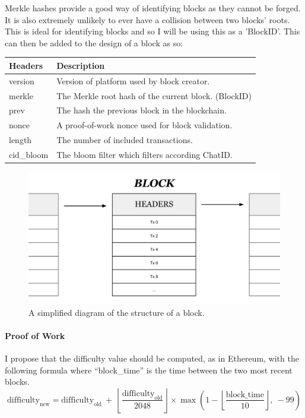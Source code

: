 \documentclass{article}
\begin{document}
Merkle hashes provide a good way of identifying blocks as they cannot be forged. It is also extremely unlikely to ever have a collision between two blocks' roots. This is ideal for identifying blocks and so I will be using this as a 'BlockID'. This can then be added to the design of a block as so:
\begin{table}[h]
\centering
\begin{tabular}{|p{2.5cm}|p{8.5cm}|}
\hline
\rowcolor{tblgrey} 
Headers    & Description                                         \\ \hline
version    & Version of platform used by block creator.          \\ \hline
merkle     & The Merkle root hash of the current block. (BlockID)\\ \hline
prev       & The hash the previous block in the blockchain.      \\ \hline
nonce      & A proof-of-work nonce used for block validation.    \\ \hline
length     & The number of included transactions.                \\ \hline
cid\_bloom & The bloom filter which filters according ChatID.    \\ \hline
\end{tabular}
\end{table}

\begin{figure}[h]
    \centering
    \includegraphics[width=0.95\linewidth]{Images/Diagrams/blockchain_block.png}
    \caption{A simplified diagram of the structure of a block.}
    \label{fig:block}
\end{figure}

\paragraph{Proof of Work}
I propose that the difficulty value should be computed, as in Ethereum, with the following formula where ``block\_time'' is the time between the two most recent blocks.
\[\textrm{difficulty}_{\textrm{new}} = \textrm{difficulty}_{\textrm{old}}
\ + \ \left\lfloor\dfrac{\textrm{difficulty}_{\textrm{old}}}{2048}\right\rfloor \times \max\left(1- \left\lfloor \frac{\textrm{block\_time}}{10} \right\rfloor,\ -99\right)\]
\end{document}
